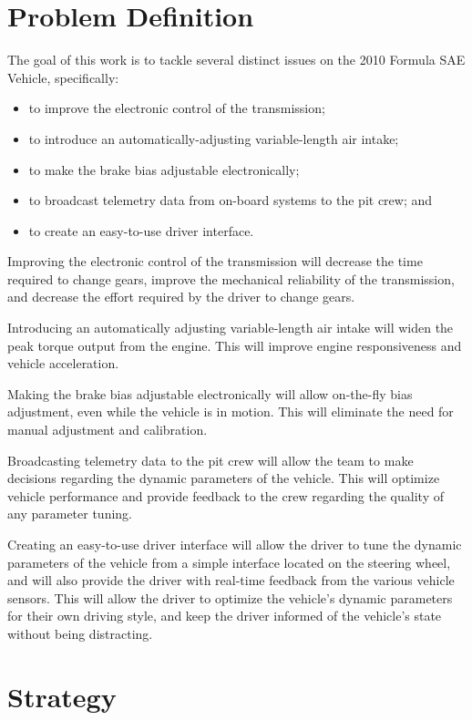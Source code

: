 \section{Problem Definition}

The goal of this work is to tackle several distinct issues on the 2010 Formula SAE Vehicle, specifically:

\begin{itemize}
 \item to improve the electronic control of the transmission;
 \item to introduce an automatically-adjusting variable-length air intake;
 \item to make the brake bias adjustable electronically;
 \item to broadcast telemetry data from on-board systems to the pit crew; and
 \item to create an easy-to-use driver interface.
\end{itemize}

Improving the electronic control of the transmission will decrease the time required to change gears, improve the mechanical reliability of the transmission, and decrease the effort required by the driver to change gears. 

Introducing an automatically adjusting variable-length air intake will widen the peak torque output from the engine. This will improve engine responsiveness and vehicle acceleration.
 
Making the brake bias adjustable electronically will allow on-the-fly bias adjustment, even while the vehicle is in motion. This will eliminate the need for manual adjustment and calibration.
 
Broadcasting telemetry data to the pit crew will allow the team to make decisions regarding the dynamic parameters of the vehicle. This will optimize vehicle performance and provide feedback to the crew regarding the quality of any parameter tuning.

Creating an easy-to-use driver interface will allow the driver to tune the dynamic parameters of the vehicle from a simple interface located on the steering wheel, and will also provide the driver with real-time feedback from the various vehicle sensors. This will allow the driver to optimize the vehicle's dynamic parameters for their own driving style, and keep the driver informed of the vehicle's state without being distracting.
 
\section{Strategy}

